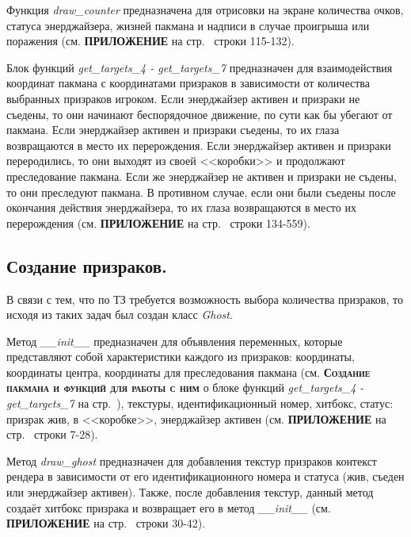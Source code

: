 Функция \textit{draw\_counter} предназначена для отрисовки на экране количества очков, статуса энерджайзера, жизней пакмана и надписи в случае проигрыша или поражения (см. \textbf{\textsc{ПРИЛОЖЕНИЕ}} на стр.~\pageref{code:player} строки 115-132).

Блок функций \textit{get\_targets\_4 - get\_targets\_7} предназначен для взаимодействия координат пакмана с координатами призраков в зависимости от количества выбранных призраков игроком. Если энерджайзер активен и призраки не съедены, то они начинают беспорядочное движение, по сути как бы убегают от пакмана. Если энерджайзер активен и призраки съедены, то их глаза возвращаются в место их перерождения. Если энерджайзер активен и призраки переродились, то они выходят из своей <<коробки>> и продолжают преследование пакмана. Если же энерджайзер не активен и призраки не съдены, то они преследуют пакмана. В противном случае, если они были съедены после окончания действия энерджайзера, то их глаза возвращаются в место их перерождения (см. \textbf{\textsc{ПРИЛОЖЕНИЕ}} на стр.~\pageref{code:player} строки 134-559).

\subsection{\label{subsec:ch02/sec01/sub06}Создание призраков.}
В связи с тем, что по ТЗ требуется возможность выбора количества призраков, то исходя из таких задач был создан класс \textit{Ghost}. 

Метод \textit{\_\_init\_\_} предназначен для объявления переменных, которые представляют собой характеристики каждого из призраков: координаты, координаты центра, координаты для преследования пакмана (см. \textbf{\textsc{Создание пакмана и функций для работы с ним}} о блоке функций \textit{get\_targets\_4 - get\_targets\_7} на стр.~\pageref{subsec:ch02/sec01/sub05}), текстуры, идентификационный номер, хитбокс, статус: призрак жив, в <<коробке>>, энерджайзер активен (см. \textbf{\textsc{ПРИЛОЖЕНИЕ}} на стр.~\pageref{code:ghost} строки 7-28).

Метод \textit{draw\_ghost} предназначен для добавления текстур призраков контекст рендера в зависимости от его идентификационного номера и статуса (жив, съеден или энерджайзер активен). Также, после добавления текстур, данный метод создаёт хитбокс призрака и возвращает его в метод \textit{\_\_init\_\_} (см. \textbf{\textsc{ПРИЛОЖЕНИЕ}} на стр.~\pageref{code:ghost} строки 30-42).

